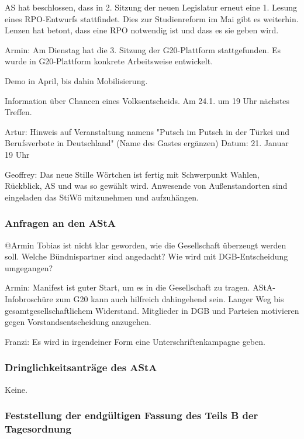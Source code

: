 \documentclass[ngerman,headheight=70pt]{scrartcl}
\begin{document}
    AS hat beschlossen, dass in 2. Sitzung der neuen Legislatur erneut eine 1.
    Lesung eines RPO-Entwurfs stattfindet. Dies zur Studienreform im Mai gibt
    es weiterhin. Lenzen hat betont, dass eine RPO notwendig ist und dass es sie
    geben wird.

    Armin:
    Am Dienstag hat die 3. Sitzung der G20-Plattform stattgefunden. Es wurde
    in G20-Plattform konkrete Arbeitsweise entwickelt.

    Demo in April, bis dahin Mobilisierung.

    Information über Chancen eines Volksentscheids. Am 24.1. um 19 Uhr nächstes
    Treffen.

    Artur:
    Hinweis auf Veranstaltung namens "Putsch im Putsch in der Türkei und
    Berufsverbote in Deutschland" (Name des Gastes ergänzen)
    Datum: 21. Januar 19 Uhr

    Geoffrey:
    Das neue Stille Wörtchen ist fertig mit Schwerpunkt Wahlen, Rückblick, AS
    und was so gewählt wird. Anwesende von Außenstandorten sind eingeladen das
    StiWö mitzunehmen und aufzuhängen.

    \subsubsection{Anfragen an den AStA}

    @Armin
    Tobias ist nicht klar geworden, wie die Gesellschaft überzeugt werden soll.
    Welche Bündnispartner sind angedacht? Wie wird mit DGB-Entscheidung umgegangen?

    Armin:
    Manifest ist guter Start, um es in die Gesellschaft zu tragen.
    AStA-Infobroschüre zum G20 kann auch hilfreich dahingehend sein. Langer Weg
    bis gesamtgesellschaftlichem Widerstand. Mitglieder in DGB und Parteien
    motivieren gegen Vorstandsentscheidung anzugehen.

    Franzi:
    Es wird in irgendeiner Form eine Unterschriftenkampagne geben.

    \subsubsection{Dringlichkeitsanträge des AStA}

    Keine.

    \subsubsection{Feststellung der endgültigen Fassung des Teils B der Tagesordnung}
\end{document}
